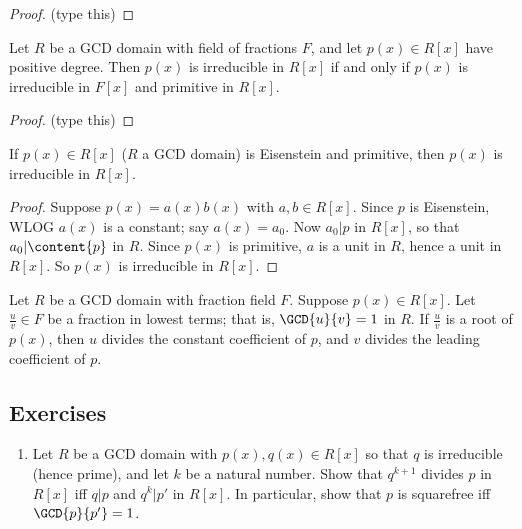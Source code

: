\documentclass{article}
\begin{document}
\begin{proof}
(type this)
\end{proof}

\begin{prop}
Let $R$ be a GCD domain with field of fractions $F$, and let $p(x) \in R[x]$ have positive degree. Then $p(x)$ is irreducible in $R[x]$ if and only if $p(x)$ is irreducible in $F[x]$ and primitive in $R[x]$.
\end{prop}

\begin{proof}
(type this)
\end{proof}

\begin{cor}
If $p(x) \in R[x]$ ($R$ a GCD domain) is Eisenstein and primitive, then $p(x)$ is irreducible in $R[x]$.
\end{cor}

\begin{proof}
Suppose $p(x) = a(x)b(x)$ with $a,b \in R[x]$. Since $p$ is Eisenstein, WLOG $a(x)$ is a constant; say $a(x) = a_0$. Now $a_0|p$ in $R[x]$, so that $a_0|\content{p}$ in $R$. Since $p(x)$ is primitive, $a$ is a unit in $R$, hence a unit in $R[x]$. So $p(x)$ is irreducible in $R[x]$.
\end{proof}

\begin{prop}
Let $R$ be a GCD domain with fraction field $F$. Suppose $p(x) \in R[x]$. Let $\frac{u}{v} \in F$ be a fraction in lowest terms; that is, $\GCD{u}{v} = 1$ in $R$. If $\frac{u}{v}$ is a root of $p(x)$, then $u$ divides the constant coefficient of $p$, and $v$ divides the leading coefficient of $p$.
\end{prop}

\subsection*{Exercises}

\begin{enumerate}
\item Let $R$ be a GCD domain with $p(x), q(x) \in R[x]$ so that $q$ is irreducible (hence prime), and let $k$ be a natural number. Show that $q^{k+1}$ divides $p$ in $R[x]$ iff $q|p$ and $q^k|p'$ in $R[x]$. In particular, show that $p$ is squarefree iff $\GCD{p}{p'} = 1$. 
\end{enumerate}
\end{document}
